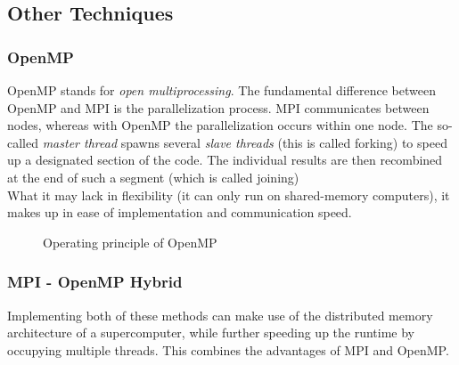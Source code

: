 \documentclass[12pt, a4paper, titlepage]{article}
\begin{document}
{\newpage
\vspace*{0.5cm}
\subsection{Other Techniques}

\subsubsection{OpenMP}

OpenMP stands for \textit{open multiprocessing}. 
The fundamental difference between OpenMP and MPI is the parallelization process. MPI communicates between nodes, whereas with OpenMP the parallelization occurs within one node. The so-called \textit{master thread} spawns several \textit{slave threads} (this is called forking) to speed up a designated section of the code. The individual results are then recombined at the end of such a segment (which is called joining)\\
What it may lack in flexibility (it can only run on shared-memory computers), it makes up in ease of implementation and communication speed.


\begin{figure}[h!]
\centering
{}
\caption{Operating principle of OpenMP}
\label{fig:openmp}
\end{figure}




\subsubsection{MPI - OpenMP Hybrid}

Implementing both of these methods can make use of the distributed memory architecture of a supercomputer, while further speeding up the runtime by occupying multiple threads. This combines the advantages of MPI and OpenMP.



}
\end{document}
